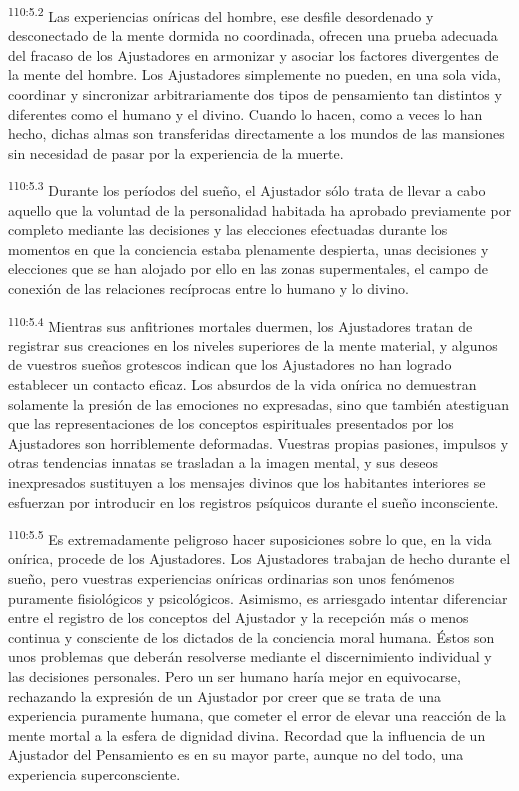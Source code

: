 \par
\textsuperscript{110:5.2} Las experiencias oníricas del hombre, ese desfile desordenado y desconectado de la mente dormida no coordinada, ofrecen una prueba adecuada del fracaso de los Ajustadores en armonizar y asociar los factores divergentes de la mente del hombre. Los Ajustadores simplemente no pueden, en una sola vida, coordinar y sincronizar arbitrariamente dos tipos de pensamiento tan distintos y diferentes como el humano y el divino. Cuando lo hacen, como a veces lo han hecho, dichas almas son transferidas directamente a los mundos de las mansiones sin necesidad de pasar por la experiencia de la muerte.

\par
\textsuperscript{110:5.3} Durante los períodos del sueño, el Ajustador sólo trata de llevar a cabo aquello que la voluntad de la personalidad habitada ha aprobado previamente por completo mediante las decisiones y las elecciones efectuadas durante los momentos en que la conciencia estaba plenamente despierta, unas decisiones y elecciones que se han alojado por ello en las zonas supermentales, el campo de conexión de las relaciones recíprocas entre lo humano y lo divino.

\par
\textsuperscript{110:5.4} Mientras sus anfitriones mortales duermen, los Ajustadores tratan de registrar sus creaciones en los niveles superiores de la mente material, y algunos de vuestros sueños grotescos indican que los Ajustadores no han logrado establecer un contacto eficaz. Los absurdos de la vida onírica no demuestran solamente la presión de las emociones no expresadas, sino que también atestiguan que las representaciones de los conceptos espirituales presentados por los Ajustadores son horriblemente deformadas. Vuestras propias pasiones, impulsos y otras tendencias innatas se trasladan a la imagen mental, y sus deseos inexpresados sustituyen a los mensajes divinos que los habitantes interiores se esfuerzan por introducir en los registros psíquicos durante el sueño inconsciente.

\par
\textsuperscript{110:5.5} Es extremadamente peligroso hacer suposiciones sobre lo que, en la vida onírica, procede de los Ajustadores. Los Ajustadores trabajan de hecho durante el sueño, pero vuestras experiencias oníricas ordinarias son unos fenómenos puramente fisiológicos y psicológicos. Asimismo, es arriesgado intentar diferenciar entre el registro de los conceptos del Ajustador y la recepción más o menos continua y consciente de los dictados de la conciencia moral humana. Éstos son unos problemas que deberán resolverse mediante el discernimiento individual y las decisiones personales. Pero un ser humano haría mejor en equivocarse, rechazando la expresión de un Ajustador por creer que se trata de una experiencia puramente humana, que cometer el error de elevar una reacción de la mente mortal a la esfera de dignidad divina. Recordad que la influencia de un Ajustador del Pensamiento es en su mayor parte, aunque no del todo, una experiencia superconsciente.

